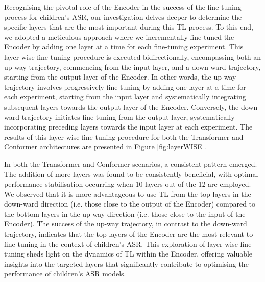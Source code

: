 Recognising the pivotal role of the Encoder in the success of the fine-tuning process for children's \ac{ASR}, our investigation delves deeper to determine the specific layers that are the most important during this \ac{TL} process. To this end, we adopted a meticulous approach where we incrementally fine-tuned the Encoder by adding one layer at a time for each fine-tuning experiment. This layer-wise fine-tuning procedure is executed bidirectionally, encompassing both an up-way trajectory, commencing from the input layer, and a down-ward trajectory, starting from the output layer of the Encoder. In other words, the up-way trajectory involves progressively fine-tuning by adding one layer at a time for each experiment, starting from the input layer and systematically integrating subsequent layers towards the output layer of the Encoder. Conversely, the down-ward trajectory initiates fine-tuning from the output layer, systematically incorporating preceding layers towards the input layer at each experiment. The results of this layer-wise fine-tuning procedure for both the Transformer and Conformer architectures are presented in Figure \ref{fig:layerWISE}.

In both the Transformer and Conformer scenarios, a consistent pattern emerged. The addition of more layers was found to be consistently beneficial, with optimal performance stabilisation occurring when 10 layers out of the 12 are employed. We observed that it is more advantageous to use \ac{TL} from the top layers in the down-ward direction (i.e. those close to the output of the Encoder) compared to the bottom layers in the up-way direction (i.e. those close to the input of the Encoder). The success of the up-way trajectory, in contrast to the down-ward trajectory, indicates that the top layers of the Encoder are the most relevant to fine-tuning in the context of children's \ac{ASR}. This exploration of layer-wise fine-tuning sheds light on the dynamics of \ac{TL} within the Encoder, offering valuable insights into the targeted layers that significantly contribute to optimising the performance of children's \ac{ASR} models. 

